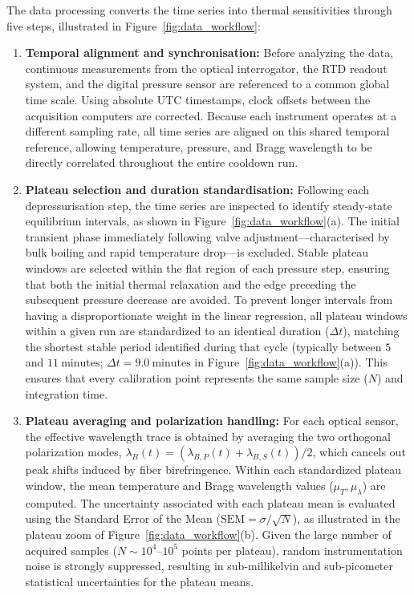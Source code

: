 \documentclass[12pt]{article}
\begin{document}
The data processing converts the time series into thermal sensitivities through five steps, illustrated in Figure~\ref{fig:data_workflow}:

\begin{enumerate}
    \item \textbf{Temporal alignment and synchronisation:}
    Before analyzing the data, continuous measurements from the optical interrogator, the RTD readout system, and the digital pressure sensor are referenced to a common global time scale. Using absolute UTC timestamps, clock offsets between the acquisition computers are corrected. Because each instrument operates at a different sampling rate, all time series are aligned on this shared temporal reference, allowing temperature, pressure, and Bragg wavelength to be directly correlated throughout the entire cooldown run.

    \item \textbf{Plateau selection and duration standardisation:}
    Following each depressurisation step, the time series are inspected to identify steady-state equilibrium intervals, as shown in Figure~\ref{fig:data_workflow}(a). The initial transient phase immediately following valve adjustment---characterised by bulk boiling and rapid temperature drop---is excluded. Stable plateau windows are selected within the flat region of each pressure step, ensuring that both the initial thermal relaxation and the edge preceding the subsequent pressure decrease are avoided. To prevent longer intervals from having a disproportionate weight in the linear regression, all plateau windows within a given run are standardized to an identical duration ($\Delta t$), matching the shortest stable period identified during that cycle (typically between $5$ and $11~\text{minutes}$; $\Delta t = 9.0~\text{minutes}$ in Figure~\ref{fig:data_workflow}(a)). This ensures that every calibration point represents the same sample size ($N$) and integration time.

    \item \textbf{Plateau averaging and polarization handling:}
    For each optical sensor, the effective wavelength trace is obtained by averaging the two orthogonal polarization modes, $\lambda_B(t) = (\lambda_{B,P}(t) + \lambda_{B,S}(t))/2$, which cancels out peak shifts induced by fiber birefringence. Within each standardized plateau window, the mean temperature and Bragg wavelength values ($\mu_T, \mu_\lambda$) are computed. The uncertainty associated with each plateau mean is evaluated using the Standard Error of the Mean ($\text{SEM} = \sigma / \sqrt{N}$), as illustrated in the plateau zoom of Figure~\ref{fig:data_workflow}(b). Given the large number of acquired samples ($N \sim 10^4$--$10^5$ points per plateau), random instrumentation noise is strongly suppressed, resulting in sub-millikelvin and sub-picometer statistical uncertainties for the plateau means.


\end{enumerate}
\end{document}
